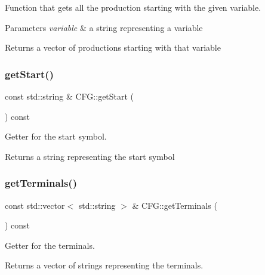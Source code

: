 Function that gets all the production starting with the given variable. 


\begin{DoxyParams}{Parameters}
{\em variable} & a string representing a variable \\
\hline
\end{DoxyParams}
\begin{DoxyReturn}{Returns}
a vector of productions starting with that variable 
\end{DoxyReturn}
\mbox{\label{classCFG_a34af6b5b23159e08693864d65e5078ff}} 
\subsubsection{\texorpdfstring{get\+Start()}{getStart()}}
{\footnotesize\ttfamily const std\+::string \& C\+F\+G\+::get\+Start (\begin{DoxyParamCaption}{ }\end{DoxyParamCaption}) const}



Getter for the start symbol. 

\begin{DoxyReturn}{Returns}
a string representing the start symbol 
\end{DoxyReturn}
\mbox{\label{classCFG_a70877e28777701a8abc6041b88fd0df3}} 
\subsubsection{\texorpdfstring{get\+Terminals()}{getTerminals()}}
{\footnotesize\ttfamily const std\+::vector$<$ std\+::string $>$ \& C\+F\+G\+::get\+Terminals (\begin{DoxyParamCaption}{ }\end{DoxyParamCaption}) const}



Getter for the terminals. 

\begin{DoxyReturn}{Returns}
a vector of strings representing the terminals. 
\end{DoxyReturn}
\mbox{\label{classCFG_ac025bd0d80e2240419aa93a2febb97f3}} 

